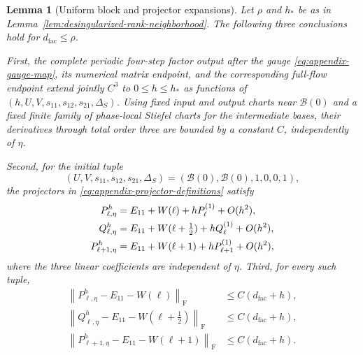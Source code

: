 \documentclass[]{article}
\numberwithin{equation}{section}
\theoremstyle{plain}
\newtheorem{lemma}[theorem]{Lemma}
\theoremstyle{remark}
\newcommand{\F}{\mathrm F}
\newcommand{\norm}[1]{\left\lVert #1\right\rVert}
\begin{document}
\begin{lemma}[Uniform block and projector expansions]
\label{lem:desingularized-block-map}
Let \(\rho\) and \(h_*\) be as in
Lemma~\ref{lem:desingularized-rank-neighborhood}.  The following three
conclusions hold for \(d_{\mathrm{fac}}\le\rho\).

First, the complete periodic four-step factor output after the gauge
\eqref{eq:appendix-gauge-map}, its numerical matrix endpoint, and the
corresponding full-flow endpoint extend jointly \(C^3\) to
\(0\le h\le h_*\) as functions of
\((h,U,V,s_{11},s_{12},s_{21},\Delta_S)\).  Using fixed input and output
charts near $\mathcal B(0)$ and a fixed finite family of phase-local
Stiefel charts for the intermediate bases, their derivatives through
total order three are bounded by a constant \(C\), independently of
\(\eta\).

Second, for the initial tuple
\begin{equation}\label{eq:appendix-initial-tuple}
 (U,V,s_{11},s_{12},s_{21},\Delta_S)
 =(\mathcal B(0),\mathcal B(0),1,0,0,1),
\end{equation}
the projectors in \eqref{eq:appendix-projector-definitions} satisfy
\begin{align}
 P^{h}_{\ell,\eta}
 &=E_{11}+W(\ell)+hP^{(1)}_\ell+O(h^2),\notag\\
 Q^{h}_{\ell,\eta}
 &=E_{11}+W(\ell+\tfrac12)+hQ^{(1)}_\ell+O(h^2),\notag\\
 P^{h}_{\ell+1,\eta}
 &=E_{11}+W(\ell+1)+hP^{(1)}_{\ell+1}+O(h^2),
 \label{eq:appendix-projector-jets}
\end{align}
where the three linear coefficients are independent of \(\eta\).
Third, for every such tuple,
\begin{equation}\label{eq:appendix-nearby-projectors}
\begin{aligned}
 \norm{P^h_{\ell,\eta}-E_{11}-W(\ell)}_{\F}
 &\le C(d_{\mathrm{fac}}+h),\\
 \norm{Q^h_{\ell,\eta}-E_{11}-W(\ell+\tfrac12)}_{\F}
 &\le C(d_{\mathrm{fac}}+h),\\
 \norm{P^h_{\ell+1,\eta}-E_{11}-W(\ell+1)}_{\F}
 &\le C(d_{\mathrm{fac}}+h).
\end{aligned}
\end{equation}
\end{lemma}
\end{document}
